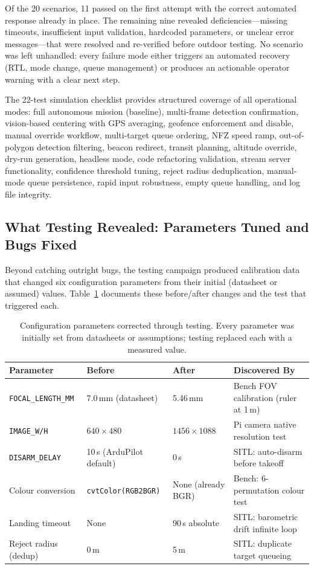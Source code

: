 Of the 20 scenarios, 11 passed on the first attempt with the correct automated response already in place. The remaining nine revealed deficiencies---missing timeouts, insufficient input validation, hardcoded parameters, or unclear error messages---that were resolved and re-verified before outdoor testing. No scenario was left unhandled: every failure mode either triggers an automated recovery (RTL, mode change, queue management) or produces an actionable operator warning with a clear next step.

The 22-test simulation checklist provides structured coverage of all operational modes: full autonomous mission (baseline), multi-frame detection confirmation, vision-based centering with GPS averaging, geofence enforcement and disable, manual override workflow, multi-target queue ordering, NFZ speed ramp, out-of-polygon detection filtering, beacon redirect, transit planning, altitude override, dry-run generation, headless mode, code refactoring validation, stream server functionality, confidence threshold tuning, reject radius deduplication, manual-mode queue persistence, rapid input robustness, empty queue handling, and log file integrity.

\subsection{What Testing Revealed: Parameters Tuned and Bugs Fixed}\label{sec:testing-revealed}

Beyond catching outright bugs, the testing campaign produced calibration data that changed six configuration parameters from their initial (datasheet or assumed) values.  Table~\ref{tab:param-tuning} documents these before/after changes and the test that triggered each.

\begin{table}[H]
\centering
\caption{Configuration parameters corrected through testing.  Every parameter was initially set from datasheets or assumptions; testing replaced each with a measured value.}
\label{tab:param-tuning}
\small
\begin{tabular}{@{}p{3.2cm}llp{3.2cm}@{}}
\toprule
\textbf{Parameter} & \textbf{Before} & \textbf{After} & \textbf{Discovered By} \\
\midrule
\texttt{FOCAL\_LENGTH\_MM} & 7.0\,mm (datasheet) & 5.46\,mm & Bench FOV calibration (ruler at 1\,m) \\
\texttt{IMAGE\_W/H} & $640 \times 480$ & $1456 \times 1088$ & Pi camera native resolution test \\
\texttt{DISARM\_DELAY} & 10\,s (ArduPilot default) & 0\,s & SITL: auto-disarm before takeoff \\
Colour conversion & \texttt{cvtColor(RGB2BGR)} & None (already BGR) & Bench: 6-permutation colour test \\
Landing timeout & None & 90\,s absolute & SITL: barometric drift infinite loop \\
Reject radius (dedup) & 0\,m & 5\,m & SITL: duplicate target queueing \\
\bottomrule
\end{tabular}
\end{table}

